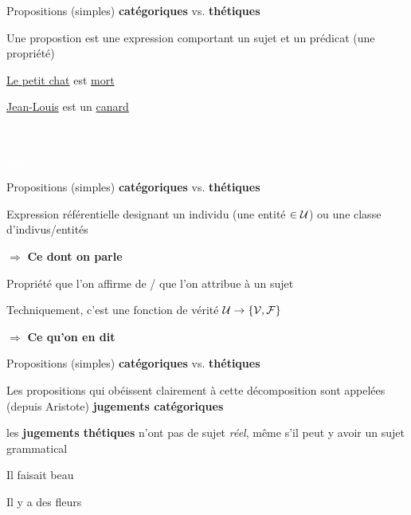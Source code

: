 \begin{frame}
	Propositions (simples) \textbf{catégoriques} vs. \textbf{thétiques} \newline
	
		\begin{description}[labelindent=6pt,style=multiline,leftmargin=1.3in]
		 \setlength\itemsep{1em}
\pause
\item[Def. classique] Une propostion est une expression comportant un sujet et un prédicat (une propriété)
\pause
\item[Exemple] \underline{Le petit chat} est \underline{mort}
\pause 
\item[] \underline{Jean-Louis} est un \underline{canard}
		 \item[] \textcolor{white}{ligne cachée}
		 \item[] \textcolor{white}{ligne cachée}

	\end{description}
\end{frame}


\begin{frame}
	Propositions (simples) \textbf{catégoriques} vs. \textbf{thétiques} \newline
	
		\begin{description}[labelindent=6pt,style=multiline,leftmargin=1.3in]
		 \setlength\itemsep{1em}
\item[Sujet] Expression référentielle designant un individu (une entité $\in \cal U$) ou une classe d'indivus/entités \pause
\item[] $\Rightarrow$ \textbf{Ce dont on parle}\pause
\item[Prédicat] Propriété que l'on affirme de / que l'on attribue à un sujet \pause
\item[] Techniquement, c'est une fonction de vérité $\cal U \rightarrow \{V,F\}$ \pause
\item[] $\Rightarrow$ \textbf{Ce qu'on en dit}

	\end{description}
\end{frame}


\begin{frame}
	Propositions (simples) \textbf{catégoriques} vs. \textbf{thétiques} \newline
	
		\begin{description}[labelindent=6pt,style=multiline,leftmargin=1.3in]
		 \setlength\itemsep{1em}
\item[Définition] Les propositions qui obéissent clairement à cette décomposition sont appelées (depuis Aristote) \textbf{jugements catégoriques} \pause
\item[Par contraste] les \textbf{jugements  thétiques} n'ont pas de sujet \textit{réel}\pause, même s'il peut y avoir un sujet grammatical \pause
\item[] Il faisait beau 
\item[] Il y a des fleurs
	\end{description}
\end{frame}



